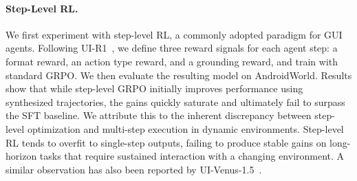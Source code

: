 \documentclass{article} %
\begin{document}
\paragraph{Step-Level RL.}
We first experiment with step-level RL, a commonly adopted paradigm for GUI agents.
Following UI-R1~\citep{lu2025ui}, we define three reward signals for each agent step: a format reward, an action type reward, and a grounding reward, and train with standard GRPO.
We then evaluate the resulting model on AndroidWorld.
Results show that while step-level GRPO initially improves performance using synthesized trajectories, the gains quickly saturate and ultimately fail to surpass the SFT baseline.
We attribute this to the inherent discrepancy between step-level optimization and multi-step execution in dynamic environments.
Step-level RL tends to overfit to single-step outputs, failing to produce stable gains on long-horizon tasks that require sustained interaction with a changing environment.
A similar observation has also been reported by UI-Venus-1.5~\citep{gao2026ui}.

\renewcommand{\arraystretch}{1.1}
\begin{table}[b]
\centering
\footnotesize
{}
\caption{Results of trajactory-level RL.}
\label{tab:app_rl}
\end{table}
\end{document}

